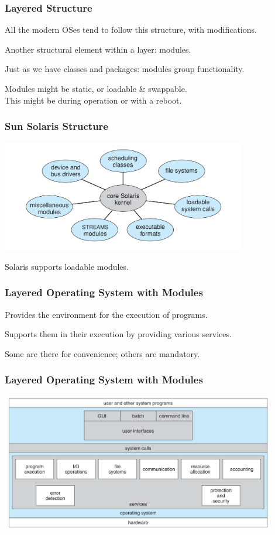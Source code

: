 \begin{frame}
\frametitle{Layered Structure}

All the modern OSes tend to follow this structure, with modifications.

Another structural element within a layer: modules.

Just as we have classes and packages: modules group functionality.

Modules might be static, or loadable \& swappable.\\
\quad This might be during operation or with a reboot.

\end{frame}

\begin{frame}
\frametitle{Sun Solaris Structure}

\begin{center}
\includegraphics[width=0.8\textwidth]{images/solaris-structure.png}
\end{center}

Solaris supports loadable modules.

\end{frame}

\begin{frame}
\frametitle{Layered Operating System with Modules}

Provides the environment for the execution of programs.

Supports them in their execution by providing various services.

Some are there for convenience; others are mandatory.

\end{frame}

\begin{frame}
\frametitle{Layered Operating System with Modules}

\begin{center}
\includegraphics[width=0.9\textwidth]{images/os-structure.png}
\end{center}

\end{frame}


